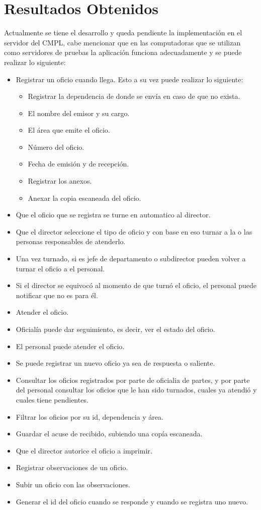 \section{Resultados Obtenidos}

Actualmente se tiene el desarrollo y queda pendiente la implementación en el servidor del CMPL, cabe mencionar que en las computadoras que se utilizan como servidores de pruebas la aplicación funciona adecuadamente y se puede realizar lo siguiente: 
 \begin{itemize}
 	\item Registrar un oficio cuando llega. 
 	Esto a su vez puede realizar lo siguiente: 
 	\begin{itemize}
 		\item Registrar la dependencia de donde se envía en caso de que no exista.
 		\item El nombre del emisor y su cargo.
 		\item El área que emite el oficio. 
 		\item Número del oficio.
 		\item Fecha de emisión y de recepción.
 		\item Registrar los anexos. 
 		\item Anexar la copia escaneada del oficio.
 	\end{itemize}
 	\item Que el oficio que se registra se turne en automatico al director.
 	\item Que el director seleccione el tipo de oficio y con base en eso turnar a la o las personas responsables de atenderlo.
 	\item Una vez turnado, si es jefe de departamento o subdirector pueden volver a turnar el oficio a el personal.
 	\item Si el director se equivocó al momento de que turnó el oficio, el personal puede notificar que no es para él.
 	\item Atender el oficio.
 	\item Oficialía puede dar seguimiento, es decir, ver el estado del oficio.
 	\item El personal puede atender el oficio. 
 	\item Se puede registrar un nuevo oficio ya sea de respuesta o saliente. 
 	\item Consultar los oficios registrados por parte de oficialia de partes, y por parte del personal consultar los oficios que le han sido turnados, cuales ya atendió y cuales tiene pendientes.
 	\item Filtrar los oficios por su id, dependencia y área. 
 	\item Guardar el acuse de recibido, subiendo una copía escaneada. 
 	\item Que el director autorice el oficio a imprimir.
 	\item Registrar observaciones de un oficio.
 	\item Subir un oficio con las observaciones.
 	\item Generar el id del oficio cuando se responde y cuando se registra uno nuevo.
 \end{itemize} 
 
